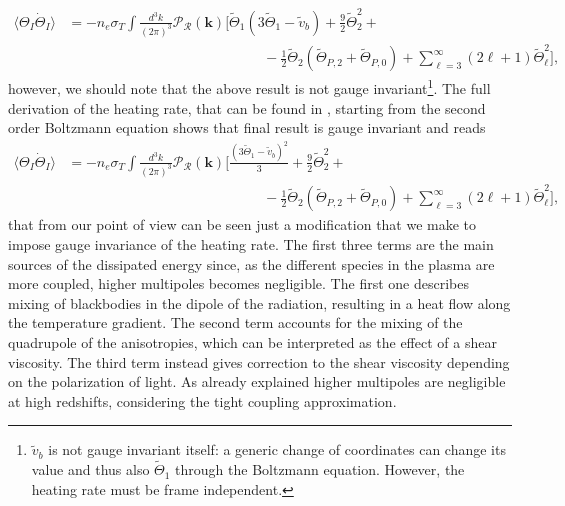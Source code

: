 \begin{align*}
    \langle\Theta_I\dot \Theta_I\rangle&=-n_e\sigma_T\int\frac{d^3k}{(2\pi)^3}\mathcal{P}_\mathcal{R} (\mathbf{k})\bigg[\tilde\Theta_1( 3\tilde\Theta_1-\tilde v_b)+\frac{9}{2}\tilde\Theta_2^2+\nonumber\\&\qquad\qquad\qquad\qquad\qquad\qquad\qquad-\frac{1}{2}\tilde\Theta_2(\tilde\Theta_{P,2}+\tilde\Theta_{P,0})+\sum_{\ell=3}^{\infty}(2\ell+1)\tilde\Theta_\ell^2\bigg],
\end{align*}
however, we should note that the above result is not gauge invariant\footnote{$\tilde v_b$ is not gauge invariant itself: a generic change of coordinates can change its value and thus also $\tilde\Theta_1$ through the Boltzmann equation. However, the heating rate must be frame independent.}. The full derivation of the heating rate, that can be found in \cite{Chluba_2x2}, starting from the second order Boltzmann equation shows that final result is gauge invariant and reads
\begin{align}
    \langle\Theta_I\dot \Theta_I\rangle&=-n_e\sigma_T\int\frac{d^3k}{(2\pi)^3}\mathcal{P}_\mathcal{R} (\mathbf{k})\bigg[\frac{( 3\tilde\Theta_1-\tilde v_b)^2}{3}+\frac{9}{2}\tilde\Theta_2^2+\nonumber\\&\qquad\qquad\qquad\qquad\qquad\qquad\qquad-\frac{1}{2}\tilde\Theta_2(\tilde\Theta_{P,2}+\tilde\Theta_{P,0})+\sum_{\ell=3}^{\infty}(2\ell+1)\tilde\Theta_\ell^2\bigg],
    \label{eq:TT_I_average_scalar}
\end{align}
that from our point of view can be seen just a modification that we make to impose gauge invariance of the heating rate. The first three terms are the main sources of the dissipated energy since, as the different species in the plasma are more coupled, higher multipoles becomes negligible. The first one describes mixing of blackbodies in the dipole of the radiation, resulting in a heat flow along the temperature gradient. The second term accounts for the mixing of the quadrupole of the anisotropies, which can be interpreted as the effect of a shear viscosity. The third term instead gives correction to the shear viscosity depending on the polarization of light. As already explained higher multipoles are negligible at high redshifts, considering the tight coupling approximation.

